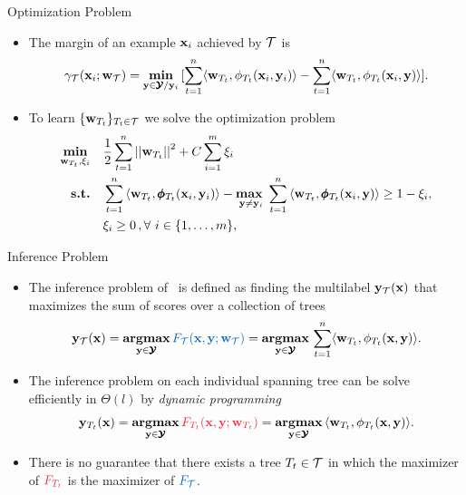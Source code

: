 \documentclass[first=dgreen,second=purple,logo=yellowexc]{aaltoslides}
\begin{document}
%
\begin{frame}{Optimization Problem}
	\begin{itemize}
		\item The margin of an example $\mathbf {x}_i$ achieved by $\mathcal{T}$ is
		\begin{align*}
		\gamma_{\mathcal{T}}(\mathbf {x}_i;\mathbf {w}_{\mathcal{T}}) = \underset{\mathbf {y}\in\pmb {\mathcal{Y}}/\mathbf {y}_i}{\textbf{min}}\,[\sum_{t=1}^{n}\langle \mathbf {w}_{T_t}, \phi_{T_t}(\mathbf {x}_i,\mathbf {y}_i) \rangle-\sum_{t=1}^{n}\langle \mathbf {w}_{T_t}, \phi_{T_t}(\mathbf {x}_i,\mathbf {y}) \rangle].
	\end{align*}
		\item To learn $\{\mathbf {w}_{T_t}\}_{T_t\in\mathcal{T}}$ we solve the optimization problem
		\begin{align*}
			\underset{\vw_{T_t},\xi_i}{\minimize} & \quad \frac{1}{2}\sum_{t=1}^{n}\norm{\vw_{T_t}}^2 + C\sum_{i=1}^{m}\xi_i\\
			\st & \quad \sum_{t=1}^{n}{ \langle \vw_{T_t}, \phib_{T_t}(\vx_i,\vy_i) \rangle} - \underset{\vy \neq \vy_i}{\maximize\ } \sum_{t=1}^{n}{\langle \vw_{T_t}, \phib_{T_t}(\vx_i,\vy) \rangle } \geq 1 -  \xi_i, \\
			& \quad \xi_i\ge0\, , \forall\ i \in \set{1,\dots,m},
		\end{align*}
	\end{itemize}
\end{frame}



%
\begin{frame}{Inference Problem}
	\begin{itemize}
		\item The inference problem of \rta\ is defined as finding the multilabel $\mathbf {y}_{\mathcal{T}}(\mathbf {x})$ that maximizes the sum of scores over a collection of trees
		\begin{align*}
			\vy_{\Tcal}(\vx) = \underset{\vy\in\vYcal}{\argmax}\,{\color{aaltoblue}F_{\Tcal}(\vx,\vy;\vw_{\Tcal})} = \underset{\vy\in\vYcal}{\argmax}\,\sum_{t=1}^{n}\ip{\vw_{T_t}}{\phi_{T_t}(\vx,\vy)}.
		\end{align*}
		\item The inference problem on each individual spanning tree can be solve efficiently in $\Theta(l)$ by \textit{dynamic programming}
		\begin{align*}
			\vy_{T_t}(\vx) = \underset{\vy\in\vYcal}{\argmax}\,{\color{aaltored}F_{T_t}(\vx,\vy;\vw_{T_t})}= \underset{\vy\in\vYcal}{\argmax}\,\ip{\vw_{T_t}}{\phi_{T_t}(\vx,\vy)}.
		\end{align*}
		\item There is no guarantee that there exists a tree $T_t\in\mathcal{T}$ in which the maximizer of ${\color{aaltored}F_{T_t}}$ is the maximizer of ${\color{aaltoblue}F_{\Tcal}}$.
	\end{itemize}
\end{frame}
\end{document}
